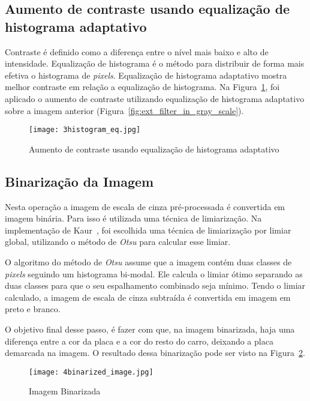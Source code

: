 \subsection{Aumento de contraste usando equalização de histograma adaptativo}

Contraste é definido como a diferença entre o nível mais baixo e alto de
intensidade. Equalização de histograma é o método para distribuir de forma mais
efetiva o histograma de \emph{pixels}. Equalização de histograma adaptativo
mostra melhor contraste em relação a equalização de histograma. Na
Figura~\ref{fig:ext_contrast_adaptive_histogram}, foi aplicado o aumento de
contraste utilizando equalização de histograma adaptativo sobre a imagem
anterior (Figura~\ref{fig:ext_filter_in_gray_scale}).

\begin{figure}[H]
	\centering
	\texttt{[image: 3histogram\_eq.jpg]}
	\caption{Aumento de contraste usando equalização de histograma adaptativo}
	\label{fig:ext_contrast_adaptive_histogram}
\end{figure}

\subsection{Binarização da Imagem}

Nesta operação a imagem de escala de cinza pré-processada é convertida em imagem
binária. Para isso é utilizada uma técnica de limiarização. Na implementação de
Kaur~\cite{kaur2014efficient}, foi escolhida uma técnica de limiarização por
limiar global, utilizando o método de \emph{Otsu} para calcular esse limiar.

O algoritmo do método de \emph{Otsu} assume que  a imagem contém duas classes de
\emph{pixels} seguindo um histograma bi-modal. Ele calcula o limiar ótimo
separando as duas classes para que o seu espalhamento combinado seja mínimo.
Tendo o limiar calculado, a imagem de escala de cinza subtraída é convertida em
imagem em preto e branco.

O objetivo final desse passo, é fazer com que, na imagem binarizada, haja uma
diferença entre a cor da placa e a cor do resto do carro, deixando a placa
demarcada na imagem. O resultado dessa binarização pode ser visto na
Figura~\ref{fig:ext_binarized_image}.

\begin{figure}[H]
	\centering
	\texttt{[image: 4binarized\_image.jpg]}
	\caption{Imagem Binarizada}
	\label{fig:ext_binarized_image}
\end{figure}

